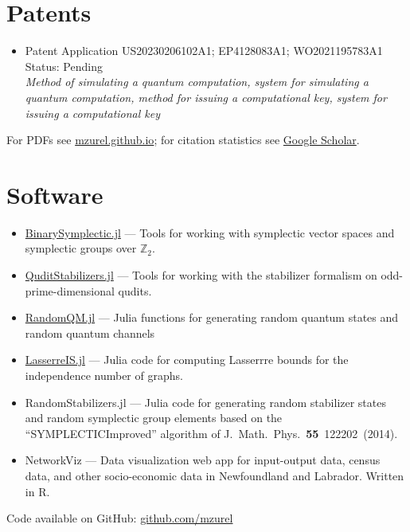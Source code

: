 \documentclass[letterpaper,11pt]{article}
\newcommand{\ConferenceItemII}[3]{
	\item{\parbox{0.97\textwidth}{
		{#1}  \hfill {#2}\\
		\emph{#3}
	}}
}
\begin{document}
\section*{Patents}
\begin{itemize}[leftmargin=*]
	\ConferenceItemII{Patent Application US20230206102A1; EP4128083A1; WO2021195783A1}{Status: Pending}{Method of simulating a quantum computation, system for simulating a quantum computation, method for issuing a computational key, system for issuing a computational key}
\end{itemize}

\nocite{ZurelRaussendorf2025,ZurelRaussendorf2024,ZurelHeimendahl2024b,ZurelHeimendahl2024a,RaussendorfFeldmann2023,OkayRaussendorf2021,ZurelRaussendorf2020,RaussendorfZurel2020}
\printbibliography[title={Publications \& preprints}]
For PDFs see \href{https://mzurel.github.io}{mzurel.github.io}; for citation statistics see \href{https://scholar.google.com/citations?user=qUA_szUAAAAJ&hl=en&oi=ao}{Google Scholar}.

\section*{Software}
\begin{itemize}[leftmargin=*]
	\item \href{https://github.com/mzurel/BinarySymplectic.jl}{BinarySymplectic.jl} --- Tools for working with symplectic vector spaces and symplectic groups over $\mathbb{Z}_2$.
	\vspace{-4pt}
	\item \href{https://github.com/mzurel/QuditStabilizers.jl}{QuditStabilizers.jl} --- Tools for working with the stabilizer formalism on odd-prime-dimensional qudits.
	\vspace{-4pt}
	\item \href{https://github.com/mzurel/RandomQM.jl}{RandomQM.jl} --- Julia functions for generating random quantum states and random quantum channels
	\vspace{-4pt}
	\item \href{https://github.com/mzurel/LasserreIS.jl}{LasserreIS.jl} --- Julia code for computing Lasserrre bounds for the independence number of graphs.
	\vspace{-4pt}
	\item %
	RandomStabilizers.jl --- Julia code for generating random stabilizer states and random symplectic group elements based on the ``SYMPLECTICImproved'' algorithm of J.~Math.~Phys.~\textbf{55}~122202~(2014).
	\vspace{-4pt}
	\item NetworkViz --- Data visualization web app for input-output data, census data, and other socio-economic data in Newfoundland and Labrador.  Written in R.
	\vspace{-4pt}
\end{itemize}
Code available on GitHub: \href{https://github.com/mzurel}{github.com/mzurel}
\end{document}
